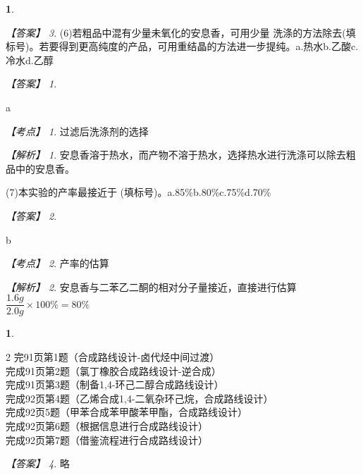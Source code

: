\documentclass[UTF8, 10pt, a4paper, oneside]{ctexart}
\newcommand{\blank}{ \underbar{\quad\addtocounter{blanks}{1}\textsuperscript{\arabic{blanks}}$\blacktriangle$\quad} }%
\newcommand{\fs}[1]{{\fangsong #1}}%
\newcounter{blanks}%
\theoremstyle{definition}
\newtheorem{exercise}{}
\newtheorem{subexercise}{}[exercise]%
\theoremstyle{remark}
\newtheorem*{answer}{【答案】}
\newtheorem*{point}{【考点】}      %
\newtheorem*{explanation}{【解析】}     %
\theoremstyle{plain}
\begin{document}
\begin{subexercise}
\begin{answer}
        (6)若粗品中混有少量未氧化的安息香，可用少量\blank 洗涤的方法除去(填标号)。若要得到更高纯度的产品，可用重结晶的方法进一步提纯。\qquad a.热水\qquad b.乙酸\qquad  c.冷水\qquad  d.乙醇
        \begin{answer}
            \begin{inparaenum}
                \item[\setcounter{enumi}{9}\textsuperscript{\arabic{enumi}}] a
            \end{inparaenum}
        \end{answer}
        \begin{point}
            过滤后洗涤剂的选择
        \end{point}
        \begin{explanation}
            安息香溶于热水，而产物不溶于热水，选择热水进行洗涤可以除去粗品中的安息香。
        \end{explanation}

        (7)本实验的产率最接近于\blank (填标号)。\qquad a.85\%\qquad b.80\%\qquad c.75\%\qquad  d.70\%
        \begin{answer}
            \begin{inparaenum}
                \item[\setcounter{enumi}{10}\textsuperscript{\arabic{enumi}}] b
            \end{inparaenum}
        \end{answer}
        \begin{point}
            产率的估算
        \end{point}
        \begin{explanation}
            安息香与二苯乙二酮的相对分子量接近，直接进行估算$\dfrac{1.6 g}{2.0 g}\times 100\% = 80\%$
        \end{explanation}
    \end{answer}
\end{subexercise}
\begin{exercise}
    \begin{multicols}{2}
        \noindent 完91页第1题（合成路线设计-卤代烃中间过渡）\\
        完成91页第2题（氯丁橡胶合成路线设计-逆合成）\\
        完成91页第3题（制备1,4-环己二醇合成路线设计）\\
        完成92页第4题（乙烯合成1,4-二氧杂环己烷，合成路线设计）\\
        完成92页5题（甲苯合成苯甲酸苯甲酯，合成路线设计）\\
        完成92页第6题（根据信息进行合成路线设计）\\
        完成92页第7题（借鉴流程进行合成路线设计）
    \end{multicols}
    \begin{answer}
        \fs{略}
    \end{answer}
\end{exercise}
\end{document}
